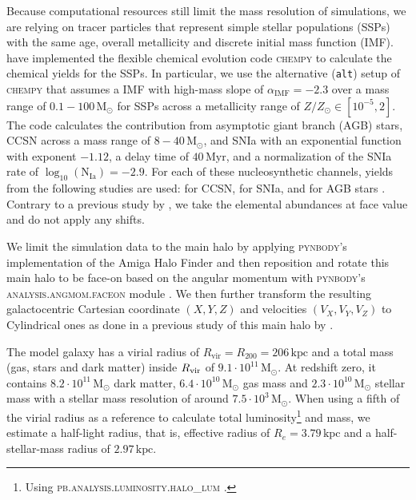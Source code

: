 \documentclass[twocolumn,apj,numberedappendix,appendixfloats,twocolappendix]{openjournal}
\begin{document}
\begin{CJK*}{UTF8}{gbsn}
Because computational resources still limit the mass resolution of simulations, we are relying on tracer particles that represent simple stellar populations (SSPs) with the same age, overall metallicity and discrete initial mass function (IMF). \citet{Buck2021} have implemented the flexible chemical evolution code \textsc{chempy} \citep{Rybizki2017} to calculate the chemical yields for the SSPs. In particular, we use the alternative (\texttt{alt}) setup of \textsc{chempy} that assumes a \citet{Chabrier2003} IMF with high-mass slope of $\alpha_\text{IMF} = -2.3$ over a mass range of $0.1-100\,\mathrm{M_\odot}$ for SSPs across a metallicity range of $Z/Z_\odot \in [10^{-5},2]$. The code calculates the contribution from asymptotic giant branch (AGB) stars, CCSN across a mass range of $8-40\,\mathrm{M_\odot}$, and SNIa with an exponential function with exponent $-1.12$, a delay time of $40\,\mathrm{Myr}$, and a normalization of the SNIa rate of $\log_{10}(\mathrm{N_{Ia}}) = -2.9$. For each of these nucleosynthetic channels, yields from the following studies are used: \citet{Chieffi2004} for CCSN, \citet{Seitenzahl2013} for SNIa, and \citet{Karakas2016} for AGB stars \citep[\texttt{new\_fit} model in][]{Buck2021}. Contrary to a previous study by \citet{Buder2024}, we take the elemental abundances at face value and do not apply any shifts.

We limit the simulation data to the main halo by applying \textsc{pynbody}'s implementation of the Amiga Halo Finder \citep{Knollman2009} and then reposition and rotate this main halo to be face-on based on the angular momentum with \textsc{pynbody}'s \textsc{analysis.angmom.faceon} module \citep{pynbody}. We then further transform the resulting galactocentric Cartesian coordinate $(X,Y,Z)$ and velocities $(V_X,V_Y,V_Z)$ to Cylindrical ones as done in a previous study of this main halo by \citet{Buder2024}.

The model galaxy has a virial radius of $R_\mathrm{vir} = R_{200}=206\,\mathrm{kpc}$ and a total mass (gas, stars and dark matter) inside $R_{\rm vir}$ of $9.1 \cdot 10^{11}\,\mathrm{M_\odot}$. At redshift zero, it contains $8.2 \cdot 10^{11}\,\mathrm{M_\odot}$ dark matter, $6.4 \cdot 10^{10}\,\mathrm{M_\odot}$ gas mass and $2.3 \cdot 10^{10}\,\mathrm{M_\odot}$ stellar mass with a stellar mass resolution of around $7.5 \cdot 10^{3}\,\mathrm{M_\odot}$. When using a fifth of the virial radius as a reference to calculate total luminosity\footnote{Using \textsc{pb.analysis.luminosity.halo\_lum} \citep{pynbody}.} and mass, we estimate a half-light radius, that is, effective radius of $R_e = 3.79\,\mathrm{kpc}$ and a half-stellar-mass radius of $\mathrm{2.97\,\mathrm{kpc}}$. 


\end{CJK*}
\end{document}
